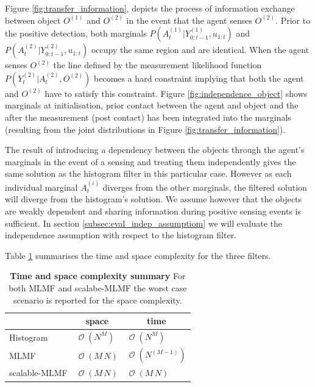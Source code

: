 \documentclass{frontiersSCNS} %
\DeclareMathOperator{\BigO}{\mathcal{O}}
\begin{document}
Figure \ref{fig:transfer_information}, depicts the process of information exchange between object $O^{(1)}$ and $O^{(2)}$ in the event that the agent 
senses $O^{(2)}$. Prior to the positive detection, both marginals $P(A^{(1)}_t|Y^{(1)}_{0:t-1},u_{1:t})$ and $P(A^{(2)}_t|Y^{(2)}_{0:t-1},u_{1:t})$ 
occupy the same region and are identical. When the agent senses $O^{(2)}$ the line defined by the measurement 
likelihood function $P(Y^{(2)}_t|A^{(2)}_t,O^{(2)})$ becomes a hard constraint implying that both the agent and $O^{(2)}$ have to satisfy this constraint.
Figure \ref{fig:independence_object} shows marginals at initialisation, prior contact between the agent and object and the after the measurement 
(post contact) has been integrated into the marginals (resulting from the joint distributions in Figure \ref{fig:transfer_information}).

The result of introducing a dependency between the objects through the agent's marginals in the event of a sensing and treating them
independently gives the same solution as the histogram filter in this particular case. However as each individual marginal $A^{(i)}_t$ diverges 
from the other marginals, the filtered solution will diverge from the histogram's solution. We assume however that the objects are weakly 
dependent and sharing information during positive sensing events is sufficient. In section \ref{subsec:eval_indep_assumptiom} we will 
evaluate the independence assumption with respect to the histogram filter.

Table \ref{tab:time_space_summary} summarises the time and space complexity for the three filters.


\begin{table}
 \centering
 \begin{tabular}{c|c|c|}
\cline{2-3}
				        &    \textbf{space}   &     \textbf{time} \\ \hline
    \multicolumn{1}{|l}{Histogram}      & \multicolumn{1}{|l}{$\BigO(N^M)$}   &  \multicolumn{1}{|l|}{$\BigO(N^M)$}      \\ \hline
    \multicolumn{1}{|l}{MLMF}           & \multicolumn{1}{|l}{$\BigO(M\,N)$}  &  \multicolumn{1}{|l|}{$\BigO(N^{(M-1)})$} \\ \hline
    \multicolumn{1}{|l}{scalable-MLMF}  & \multicolumn{1}{|l}{$\BigO(M\,N)$}  &  \multicolumn{1}{|l|}{$\BigO(M\,N)$}     \\ \hline
   \end{tabular}
   \caption{\textbf{Time and space complexity summary} For both MLMF and scalabe-MLMF the worst case scenario is reported for the space complexity.}
   \label{tab:time_space_summary}
\end{table}
\end{document}
